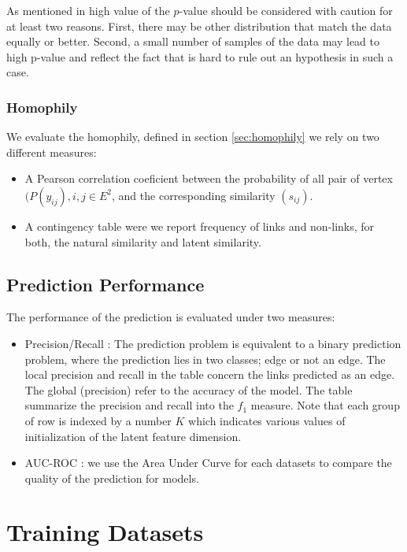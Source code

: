 \documentclass[a4paper, 12pt]{article}
\begin{document}
As mentioned in \cite{clauset2009power} high value of the $p$-value should be considered with caution for at least two reasons. First, there may be other distribution that match the data equally or better. Second, a small number of samples of the data may lead to high p-value and reflect the fact that is hard to rule out an hypothesis in such a case.

\subsubsection{Homophily}

We evaluate the homophily, defined in section \ref{sec:homophily} we rely on two different measures:

\begin{itemize}
    \item A Pearson correlation coeficient between the probability of all pair of vertex $(P(y_{ij}),  i, j \in E^2 $, and the corresponding similarity $(s_{ij})$. 
    \item A contingency table were we report frequency of links and non-links, for both, the natural similarity and latent similarity.
\end{itemize}

\subsection{Prediction Performance}

The performance of the prediction is evaluated under two measures:

\begin{itemize}

\item Precision/Recall :  The prediction problem is equivalent to a binary prediction problem, where the prediction lies in two classes; edge or not an edge. The local precision and recall in the table concern the links predicted as an edge. The global (precision) refer to the accuracy of the model. The table summarize the precision and recall into the $f_1$ measure. Note that each group of row is indexed by  a number $K$ which indicates various values of initialization of the latent feature dimension.
\item AUC-ROC : we use the Area Under Curve for each datasets to compare the quality of the prediction for models.
\end{itemize}

\section{Training Datasets}
\end{document}
